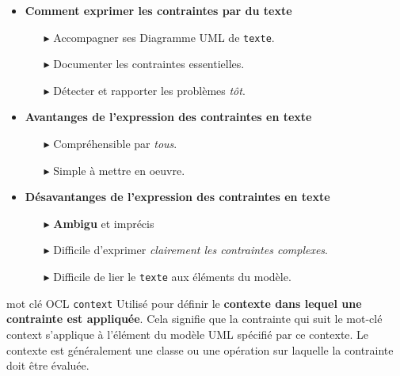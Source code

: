 \documentclass[16pt]{report}
\begin{document}
\begin{multicols*}{2}
        \begin{itemize}
            \item \textbf{Comment exprimer les contraintes par du texte} 
            \begin{itemize}
                \item[$\blacktriangleright$] Accompagner ses Diagramme UML de \texttt{texte}.
                \item[$\blacktriangleright$] Documenter les contraintes essentielles. 
                \item[$\blacktriangleright$] Détecter et rapporter les problèmes \textit{tôt}.  
            \end{itemize}
            \item \textbf{Avantanges de l'expression des contraintes en texte}
                \begin{itemize}
                    \item[$\blacktriangleright$] Compréhensible par \textit{tous}.   
                    \item[$\blacktriangleright$] Simple à mettre en oeuvre.  
                \end{itemize}
            \item \textbf{Désavantanges de l'expression des contraintes en texte}
                \begin{itemize}
                    \item[$\blacktriangleright$] \textbf{Ambigu} et imprécis   
                    \item[$\blacktriangleright$] Difficile d'exprimer \textit{clairement les contraintes complexes}.  
                    \item[$\blacktriangleright$] Difficile de lier le \texttt{texte} aux éléments du modèle. 
                \end{itemize}
        \end{itemize}


        \begin{Definitionx}{mot clé OCL \texttt{context}  }{}
            Utilisé pour définir le \textbf{contexte dans lequel une contrainte est appliquée}. 
            Cela signifie que la contrainte qui suit le mot-clé context s'applique à 
            l'élément du modèle UML spécifié par ce contexte. Le contexte est généralement 
            une \textcolor{myb}{classe} ou une \textcolor{myb}{opération} 
            sur laquelle la contrainte doit être évaluée.
        \end{Definitionx}


\end{multicols*}
\end{document}
